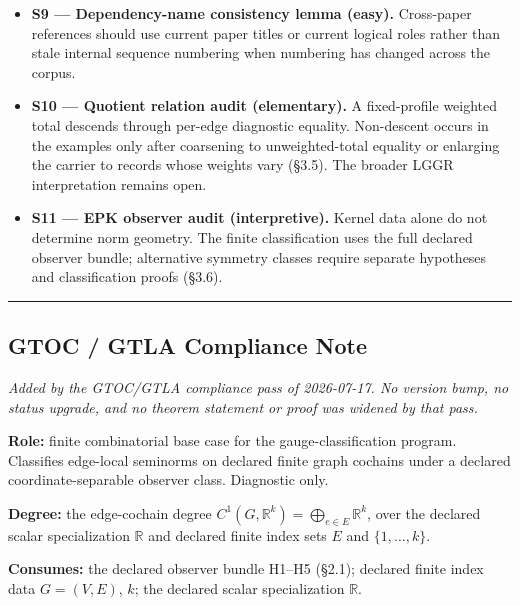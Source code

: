 \documentclass[
  11pt,
]{article}
\begin{document}
\begin{itemize}
  scalar function \(\psi:\mathbb R\to\mathbb R_{\ge0}\) is absolutely
  homogeneous and used in a coordinate-separable disjoint-additive
  diagnostic, then \(\psi(t)=C|t|\). If instead one wants a
  Cauchy-equation proof from additivity and regularity, the exact
  regularity assumption must be stated.
\item
  \textbf{S9 --- Dependency-name consistency lemma (easy).} Cross-paper
  references should use current paper titles or current logical roles
  rather than stale internal sequence numbering when numbering has
  changed across the corpus.
\item
  \textbf{S10 --- Quotient relation audit (elementary).} A fixed-profile
  weighted total descends through per-edge diagnostic equality.
  Non-descent occurs in the examples only after coarsening to
  unweighted-total equality or enlarging the carrier to records whose
  weights vary (§3.5). The broader LGGR interpretation remains open.
\item
  \textbf{S11 --- EPK observer audit (interpretive).} Kernel data alone
  do not determine norm geometry. The finite classification uses the
  full declared observer bundle; alternative symmetry classes require
  separate hypotheses and classification proofs (§3.6).
\end{itemize}

\begin{center}\rule{0.5\linewidth}{0.5pt}\end{center}

\hypertarget{gtoc-gtla-compliance-note}{%
\subsection{GTOC / GTLA Compliance
Note}\label{gtoc-gtla-compliance-note}}

\emph{Added by the GTOC/GTLA compliance pass of 2026-07-17. No version
bump, no status upgrade, and no theorem statement or proof was widened
by that pass.}

\textbf{Role:} finite combinatorial base case for the
gauge-classification program. Classifies edge-local seminorms on
declared finite graph cochains under a declared coordinate-separable
observer class. Diagnostic only.

\textbf{Degree:} the edge-cochain degree
\(C^1(G,\mathbb R^k)=\bigoplus_{e\in E}\mathbb R^k\), over the declared
scalar specialization \(\mathbb R\) and declared finite index sets \(E\)
and \(\{1,\dots,k\}\).

\textbf{Consumes:} the declared observer bundle H1--H5 (§2.1); declared
finite index data \(G=(V,E)\), \(k\); the declared scalar specialization
\(\mathbb R\).
\end{document}
